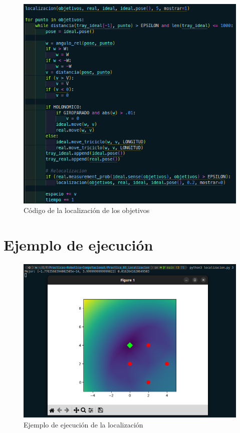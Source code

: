 \documentclass[11pt]{report}
\begin{document}
\begin{figure}[H]
  \centering
  \includegraphics[scale=0.45]{img/localizacion_objetivos.png}
  \caption{Código de la localización de los objetivos}
\end{figure}

\newpage

\section{Ejemplo de ejecución}
\begin{figure}[H]
  \centering
  \includegraphics[scale=0.42]{img/localizacion_0.png}
  \caption{Ejemplo de ejecución de la localización}
\end{figure}
\end{document}
